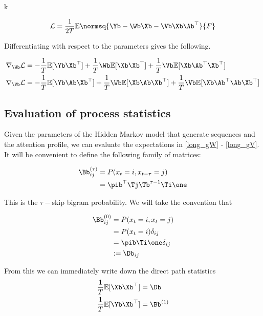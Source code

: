 k\documentclass{article}
\begin{document}
\begin{equation}\label{loss}
     \mathcal{L} = \frac{1}{2T} \mathbb{E}\normsq{\Yb - \Wb \Xb - \Vb \Xb \Ab^\top}{F}
\end{equation}

Differentiating with respect to the parameters gives the following.

\begin{align}
     \nabla_{\Wb}\mathcal{L} &= - \frac{1}{T}\mathbb{E}[\Yb\Xb^\top] + \frac{1}{T}\Wb\mathbb{E}[\Xb\Xb^\top] + \frac{1}{T}\Vb\mathbb{E}[\Xb \Ab^\top\Xb^\top]  \label{long_gW}\\ 
     \nabla_{\Vb}\mathcal{L} &= - \frac{1}{T}\mathbb{E}[\Yb\Ab\Xb^\top] + \frac{1}{T}\Wb\mathbb{E}[\Xb\Ab\Xb^\top] + \frac{1}{T}\Vb\mathbb{E}[\Xb \Ab^\top\Ab\Xb^\top]\label{long_gV}
\end{align}

\subsection{Evaluation of process statistics}\label{sec:stats}
Given the parameters of the Hidden Markov model that generate sequences and the attention profile, we can evaluate the expectations in \eqref{long_gW} - \eqref{long_gV}. It will be convenient to define the following family of matrices:


\begin{align}
     \Bb^{(\tau)}_{ij} &= P(x_{t} = i, x_{t-\tau} = j) \label{btau}\\
     &= \pib^\top \Tj \Tb^{\tau-1} \Ti \one
\end{align}

This is the $\tau-$skip bigram probability. We will take the convention that 

\begin{align}
    \Bb^{(0)}_{ij} &= P(x_{t} = i, x_{t} = j) \label{b0}\\
    &= P(x_t = i)\delta_{ij}\\
    &= \pib \Ti \one \delta_{ij} \\
    &:= \Db_{ij}
\end{align}

From this we can immediately write down the direct path statistics
\begin{align}
    \frac{1}{T}\mathbb{E}[\Xb\Xb^\top] &= \Db \label{XX}\\
    \frac{1}{T}\mathbb{E}[\Yb\Xb^\top] &= \Bb^{(1)} \label{YX}
\end{align}
\end{document}
